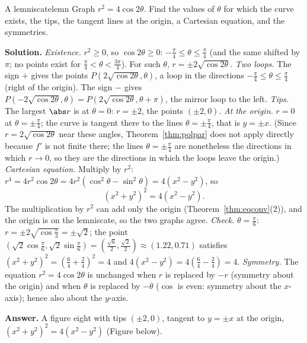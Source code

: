 \documentclass[11pt]{article}
\begin{document}
\begin{exmp}{A lemniscate}{lemn}
Graph $r^2=4\cos2\theta$. Find the values of $\theta$ for which the curve exists, the tips, the tangent lines at the origin, a Cartesian equation, and the symmetries.

\textbf{Solution.} \emph{Existence.} $r^2\ge0$, so $\cos2\theta\ge0$: $-\frac\pi4\le\theta\le\frac\pi4$ (and the same shifted by $\pi$; no points exist for $\frac\pi4<\theta<\frac{3\pi}4$). For such $\theta$, $r=\pm2\sqrt{\cos2\theta}$. \emph{Two loops.} The sign $+$ gives the points $P(2\sqrt{\cos2\theta},\theta)$, a loop in the directions $-\frac\pi4\le\theta\le\frac\pi4$ (right of the origin). The sign $-$ gives $P(-2\sqrt{\cos2\theta},\theta)=P(2\sqrt{\cos2\theta},\theta+\pi)$, the mirror loop to the left. \emph{Tips.} The largest $\abs r$ is at $\theta=0$: $r=\pm2$, the points $(\pm2,0)$. \emph{At the origin.} $r=0$ at $\theta=\pm\frac\pi4$; the curve is tangent there to the lines $\theta=\pm\frac\pi4$, that is $y=\pm x$. (Since $r=2\sqrt{\cos2\theta}$ near these angles, Theorem~\ref{thm:polpar} does not apply directly because $f'$ is not finite there; the lines $\theta=\pm\frac\pi4$ are nonetheless the directions in which $r\to0$, so they are the directions in which the loops leave the origin.)
\emph{Cartesian equation.} Multiply by $r^2$: $r^4=4r^2\cos2\theta=4r^2\left(\cos^2\theta-\sin^2\theta\right)=4\left(x^2-y^2\right)$, so
\[
(x^2+y^2)^2=4\left(x^2-y^2\right).
\]
The multiplication by $r^2$ can add only the origin (Theorem~\ref{thm:eqconv}(2)), and the origin is on the lemniscate, so the two graphs agree. \emph{Check.} $\theta=\frac\pi6$: $r=\pm2\sqrt{\cos\frac\pi3}=\pm\sqrt2$; the point $\left(\sqrt2\cos\frac\pi6,\sqrt2\sin\frac\pi6\right)=\left(\frac{\sqrt6}2,\frac{\sqrt2}2\right)\approx(1.22,0.71)$ satisfies $(x^2+y^2)^2=\left(\frac64+\frac24\right)^2=4$ and $4(x^2-y^2)=4\left(\frac64-\frac24\right)=4$.
\emph{Symmetry.} The equation $r^2=4\cos2\theta$ is unchanged when $r$ is replaced by $-r$ (symmetry about the origin) and when $\theta$ is replaced by $-\theta$ ($\cos$ is even: symmetry about the $x$-axis); hence also about the $y$-axis.

\textbf{Answer.} A figure eight with tips $(\pm2,0)$, tangent to $y=\pm x$ at the origin, $(x^2+y^2)^2=4(x^2-y^2)$ (Figure below).
\end{exmp}
\end{document}
